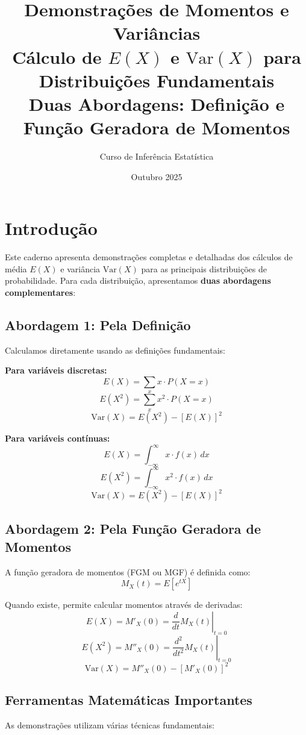 \documentclass[12pt,a4paper]{article}
\title{Demonstrações de Momentos e Variâncias\\
\large Cálculo de \(E(X)\) e \(\text{Var}(X)\) para Distribuições Fundamentais\\
\normalsize Duas Abordagens: Definição e Função Geradora de Momentos}
\author{Curso de Inferência Estatística}
\date{Outubro 2025}
\theoremstyle{plain}
\theoremstyle{definition}
\theoremstyle{remark}
\begin{document}
\maketitle
\tableofcontents
\newpage

\section{Introdução}

Este caderno apresenta demonstrações completas e detalhadas dos cálculos de média \(E(X)\) e variância \(\text{Var}(X)\) para as principais distribuições de probabilidade. Para cada distribuição, apresentamos \textbf{duas abordagens complementares}:

\subsection{Abordagem 1: Pela Definição}

Calculamos diretamente usando as definições fundamentais:

\textbf{Para variáveis discretas:}
\[
E(X) = \sum_{x} x \cdot P(X = x)
\]
\[
E(X^2) = \sum_{x} x^2 \cdot P(X = x)
\]
\[
\text{Var}(X) = E(X^2) - [E(X)]^2
\]

\textbf{Para variáveis contínuas:}
\[
E(X) = \int_{-\infty}^{\infty} x \cdot f(x) \, dx
\]
\[
E(X^2) = \int_{-\infty}^{\infty} x^2 \cdot f(x) \, dx
\]
\[
\text{Var}(X) = E(X^2) - [E(X)]^2
\]

\subsection{Abordagem 2: Pela Função Geradora de Momentos}

A função geradora de momentos (FGM ou MGF) é definida como:
\[
M_X(t) = E[e^{tX}]
\]

Quando existe, permite calcular momentos através de derivadas:
\[
E(X) = M'_X(0) = \left. \frac{d}{dt} M_X(t) \right|_{t=0}
\]
\[
E(X^2) = M''_X(0) = \left. \frac{d^2}{dt^2} M_X(t) \right|_{t=0}
\]
\[
\text{Var}(X) = M''_X(0) - [M'_X(0)]^2
\]

\subsection{Ferramentas Matemáticas Importantes}

As demonstrações utilizam várias técnicas fundamentais:
\end{document}
